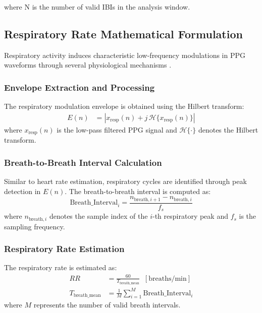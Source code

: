 \documentclass{ieeeaccess}
\begin{document}
where N is the number of valid IBIs in the analysis window.

\subsection{Respiratory Rate Mathematical Formulation}
Respiratory activity induces characteristic low-frequency modulations in PPG waveforms through several physiological mechanisms \cite{b17}.

\subsubsection{Envelope Extraction and Processing}
The respiratory modulation envelope is obtained using the Hilbert transform:
\begin{equation}
\begin{aligned}
E(n) &= \left| x_{\text{resp}}(n) 
+ j\,\mathcal{H}\{x_{\text{resp}}(n)\} \right|
\end{aligned}
\end{equation}
where $x_{\text{resp}}(n)$ is the low-pass filtered PPG signal and $\mathcal{H}\{\cdot\}$ denotes the Hilbert transform.

\subsubsection{Breath-to-Breath Interval Calculation}
Similar to heart rate estimation, respiratory cycles are identified through peak detection in $E(n)$. The breath-to-breath interval is computed as:
\begin{equation}
\text{Breath\_Interval}_i =
\frac{n_{\text{breath},i+1} - n_{\text{breath},i}}{f_s}
\end{equation}
where $n_{\text{breath},i}$ denotes the sample index of the $i$-th respiratory peak and $f_s$ is the sampling frequency.

\subsubsection{Respiratory Rate Estimation}
The respiratory rate is estimated as:
\begin{equation}
\begin{aligned}
RR &= \frac{60}{T_{\text{breath\_mean}}} \;\; [\text{breaths/min}] \\
T_{\text{breath\_mean}} &= \frac{1}{M} \sum_{i=1}^{M} \text{Breath\_Interval}_i
\end{aligned}
\end{equation}
where $M$ represents the number of valid breath intervals.
\end{document}
